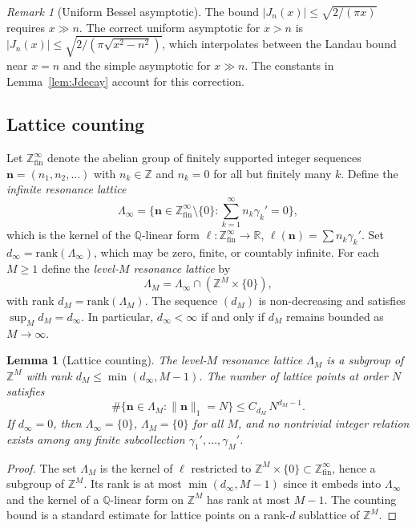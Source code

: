 \documentclass[12pt,reqno]{amsart}
\theoremstyle{plain}
\newtheorem{lemma}[theorem]{Lemma}
\theoremstyle{definition}
\theoremstyle{remark}
\newtheorem{remark}[theorem]{Remark}
\newcommand{\Q}{\mathbb{Q}}
\newcommand{\Z}{\mathbb{Z}}
\newcommand{\R}{\mathbb{R}}
\begin{document}
\begin{remark}[Uniform Bessel asymptotic]
The bound $|J_n(x)| \leq \sqrt{2/(\pi x)}$ requires $x \gg n$.  The correct uniform asymptotic for $x > n$ is $|J_n(x)| \leq \sqrt{2/(\pi\sqrt{x^2 - n^2})}$, which interpolates between the Landau bound near $x = n$ and the simple asymptotic for $x \gg n$.  The constants in Lemma~\ref{lem:Jdecay} account for this correction.
\end{remark}


\subsection{Lattice counting}\label{subsec:lattice-counting}

\noindent
Let $\Z^\infty_{\mathrm{fin}}$ denote the abelian group of finitely supported integer sequences $\mathbf{n} = (n_1, n_2, \ldots)$ with $n_k \in \Z$ and $n_k = 0$ for all but finitely many $k$.  Define the \emph{infinite resonance lattice}
\[
  \Lambda_\infty = \bigl\{\mathbf{n} \in \Z^\infty_{\mathrm{fin}} \setminus \{0\} : \textstyle\sum_{k=1}^\infty n_k \gamma_k' = 0\bigr\},
\]
which is the kernel of the $\Q$-linear form $\ell : \Z^\infty_{\mathrm{fin}} \to \R$, $\ell(\mathbf{n}) = \sum n_k \gamma_k'$.  Set $d_\infty = \mathrm{rank}(\Lambda_\infty)$, which may be zero, finite, or countably infinite.  For each $M \geq 1$ define the \emph{level-$M$ resonance lattice} by
\[
  \Lambda_M = \Lambda_\infty \cap (\Z^M \times \{0\}),
\]
with rank $d_M = \mathrm{rank}(\Lambda_M)$.  The sequence $(d_M)$ is non-decreasing and satisfies $\sup_M d_M = d_\infty$.  In particular, $d_\infty < \infty$ if and only if $d_M$ remains bounded as $M \to \infty$.

\begin{lemma}[Lattice counting]\label{lem:lattice}
The level-$M$ resonance lattice $\Lambda_M$ is a subgroup of $\Z^M$ with rank $d_M \leq \min(d_\infty, M-1)$.  The number of lattice points at order $N$ satisfies
\[
  \#\{\mathbf{n} \in \Lambda_M : \|\mathbf{n}\|_1 = N\} \leq C_{d_M}\, N^{d_M-1}.
\]
If $d_\infty = 0$, then $\Lambda_\infty = \{0\}$, $\Lambda_M = \{0\}$ for all $M$, and no nontrivial integer relation exists among any finite subcollection $\gamma_1',\ldots,\gamma_M'$.
\end{lemma}

\begin{proof}
The set $\Lambda_M$ is the kernel of $\ell$ restricted to $\Z^M \times \{0\} \subset \Z^\infty_{\mathrm{fin}}$, hence a subgroup of $\Z^M$.  Its rank is at most $\min(d_\infty, M-1)$ since it embeds into $\Lambda_\infty$ and the kernel of a $\Q$-linear form on $\Z^M$ has rank at most $M-1$.  The counting bound is a standard estimate for lattice points on a rank-$d$ sublattice of $\Z^M$.
\end{proof}
\end{document}
